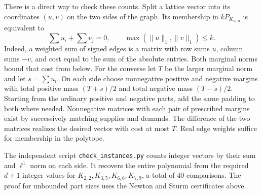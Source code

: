There is a direct way to check these counts. Split a lattice vector into its coordinates $(u,v)$ on the two sides of the graph. Its membership in $kP_{K_{m,n}}$ is equivalent to
\[
       {\textstyle\sum} u_i+{\textstyle\sum} v_j=0,\qquad
       \max(\|u\|_1,\|v\|_1)\le k.
\]
Indeed, a weighted sum of signed edges is a matrix with row sums $u$, column sums $-v$, and cost equal to the sum of the absolute entries. Both marginal norms bound that cost from below. For the converse let $T$ be the larger marginal norm and let $s=\sum u_i$. On each side choose nonnegative positive and negative margins with total positive mass $(T+s)/2$ and total negative mass $(T-s)/2$. Starting from the ordinary positive and negative parts, add the same padding to both where needed. Nonnegative matrices with each pair of prescribed margins exist by successively matching supplies and demands. The difference of the two matrices realizes the desired vector with cost at most $T$. Real edge weights suffice for membership in the polytope.

The independent script \texttt{check\_instances.py} counts integer vectors by their sum and $\ell^1$ norm on each side. It recovers the entire polynomial from the required $d+1$ integer values for $K_{2,2},K_{3,5},K_{6,6},K_{7,9}$, a total of 40 comparisons. The proof for unbounded part sizes uses the Newton and Sturm certificates above.

